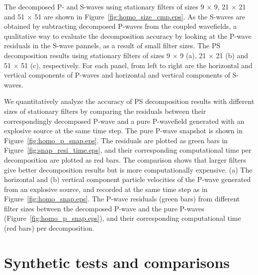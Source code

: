 \documentclass[manuscript,ulem,graphix,revised]{geophysics}
\begin{document}
The decomposed P- and S-waves using stationary filters of sizes 9 $\times$ 9, 21 $\times$ 21 and 51 $\times$ 51 are shown in Figure~\ref{fig:homo_size_cmp.eps}. As the S-waves are obtained by subtracting decomposed P-waves from the coupled wavefields, a qualitative way to evaluate the decomposition accuracy by looking at the P-wave residuals in the S-wave pannels, as a result of small filter sizes.
{
The PS decomposition results using stationary filters of sizes 9 $\times$ 9 (a), 21 $\times$ 21 (b) and 51 $\times$ 51 (c), respectively. For each panel, from left to right are the horizontal and vertical components of P-waves and horizontal and vertical components of S-waves.
}
  
We quantitatively analyze the accuracy of PS decomposition results with different sizes of stationary filters by comparing the residuals between their correspondingly decomposed P-wave and a pure P-wavefield generated with an explosive source at the same time step. The pure P-wave snapshot is shown in Figure~\ref{fig:homo_p_snap.eps}. 
The residuals are plotted as green bars in Figure~\ref{fig:snap_resi_time.eps}, and their corresponding computational time per decomposition are plotted as red bars. The comparison shows that larger filters give better decomposition results but is more computationally expensive.
{
(a) The horizontal and (b) vertical component particle velocities of the P-wave generated from an explosive source, and recorded at the same time step as in Figure~\ref{fig:homo_snap.eps}.
}
{
The P-wave residuals (green bars) from different filter sizes between the decomposed P-wave and the pure P-waves (Figure~\ref{fig:homo_p_snap.eps}), and their corresponding computational time (red bars) per decomposition.
}

%
%
\section{Synthetic tests and comparisons}
\end{document}
